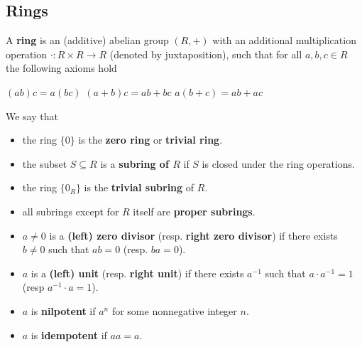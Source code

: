 \subsection{Rings}\label{sec:rings}

\begin{definition}\label{def:ring}
  A \textbf{ring} is an (additive) abelian group \( (R, +) \) with an additional multiplication operation \( \cdot: R \times R \to R \) (denoted by juxtaposition), such that for all \( a, b, c \in R \) the following axioms hold
  \begin{description}
     \( (ab)c = a(bc) \)
     \( (a + b)c = ab + bc \)
     \( a(b + c) = ab + ac \)
  \end{description}

  We say that
  \begin{itemize}
    \item\label{def:ring/trivial_group} the ring \( \{ 0 \} \) is the \textbf{zero ring} or \textbf{trivial ring}.
    \item\label{def:ring/subring} the subset \( S \subseteq R \) is a \textbf{subring of \( R \)} if \( S \) is closed under the ring operations.
    \item\label{def:ring/trivial_subgroup} the ring \( \{ 0_R \} \) is the \textbf{trivial subring} of \( R \).
    \item\label{def:ring/proper_subring} all subrings except for \( R \) itself are \textbf{proper subrings}.
    \item\label{def:ring/zero_divisor} \( a \neq 0 \) is a \textbf{(left) zero divisor} (resp. \textbf{right zero divisor}) if there exists \( b \neq 0 \) such that \( ab = 0 \) (resp. \( ba = 0 \)).
    \item\label{def:ring/unit} \( a \) is a \textbf{(left) unit} (resp. \textbf{right unit}) if there exists \( a^{-1} \) such that \( a \cdot a^{-1} = 1 \) (resp \( a^{-1} \cdot a = 1 \)).
    \item\label{def:ring/nilpotent_element} \( a \) is \textbf{nilpotent} if \( a^n \) for some nonnegative integer \( n \).
    \item\label{def:ring/idempotent_element} \( a \) is \textbf{idempotent} if \( aa = a \).
  \end{itemize}


\end{definition}
